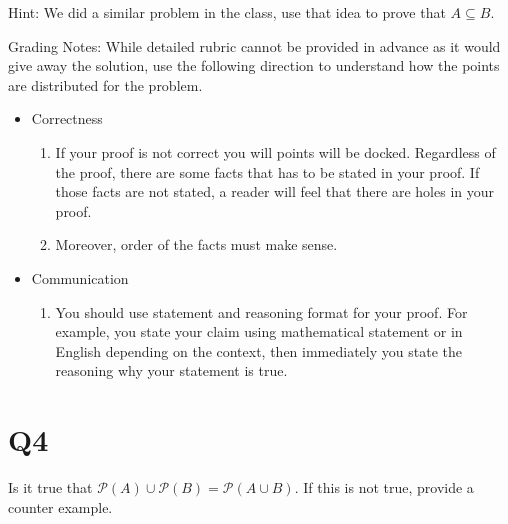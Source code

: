 \documentclass[12pt]{exam}
\begin{document}
Hint: We did a similar problem in the class, use that idea to prove that $A \subseteq B$.

Grading Notes:
While detailed rubric cannot be provided in advance as it would give away the solution, use the following direction to understand how the points are distributed for the problem.
\begin{itemize}
    \item Correctness
    \begin{enumerate}
        \item If your proof is not correct you will points will be docked. Regardless of the proof, there are some facts that has to be stated in your proof. If those facts are not stated, a reader will feel that there are holes in your proof. 
        \item Moreover, order of the facts must make sense. 
    \end{enumerate}
        
    \item Communication 
        \begin{enumerate}
            \item You should use statement and reasoning format for your proof. For example, you state your claim using mathematical statement or in English depending on the context, then immediately you state the reasoning why your statement is true.
        \end{enumerate}
\end{itemize}

\section{Q4}
Is it true that $\mathcal{P}(A) \cup \mathcal{P}(B) = \mathcal{P}(A \cup B)$. If this is not true, provide a counter example.
\end{document}
